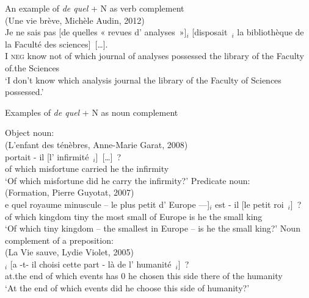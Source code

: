 \ea An example of \emph{de quel} + N as verb complement\\
(Une vie brève, Michèle Audin, 2012)\\
\gll Je ne sais pas [de quelles « revues d' analyses~»]$_i$ [disposait~\trace{}$_i$ la bibliothèque de la Faculté des sciences]~[\dots].\\
I \textsc{neg} know not of which {} journal of analyses possessed the library of the Faculty of.the Sciences\\
\glt `I don't know which analysis journal the library of the Faculty of Sciences possessed.'
\label{ex:deq-verb-qu}
\z 
\pagebreak
\begin{exe}
    \ex Examples of \emph{de quel} + N as noun complement\label{ex:deq-noun-qu}
\begin{xlist}
\ex Object noun:\\
(L'enfant des ténèbres, Anne-Marie Garat, 2008)\\
 portait - il [l' infirmité~\trace{}$_i$]~[\dots]~?\\
of which misfortune carried {} he the infirmity\\
\glt `Of which misfortune did he carry the infirmity?'
\ex Predicate noun:\\
(Formation, Pierre Guyotat, 2007)\\
\gll [[D]e quel royaume minuscule -- le plus petit d' Europe ---]$_i$ est - il [le petit roi~\trace{}$_i$]~?\\
of which kingdom tiny {} the most small of Europe {} is {} he the small king\\
\glt `Of which tiny kingdom -- the smallest in Europe -- is he the small king?'
\ex Noun complement of a preposition:\\
(La Vie sauve, Lydie Violet, 2005)\\
$_i$ [a -t- il choisi cette part - là de l' humanité~\trace{}$_i$]~?\\
at.the end of which events has 0\footnotemark{} he chosen this side {} there of the humanity\\
\glt `At the end of which events did he choose this side of humanity?'
\end{xlist}
\end{exe}

